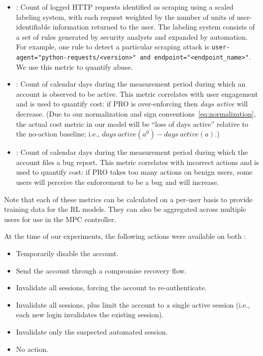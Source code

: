 \begin{itemize}
\squeezelist
    \item \scraping: Count of logged HTTP requests identified as scraping using a scaled labeling system, with each request weighted by the number of units of user-identifiable information returned to the user. The labeling system consists of a set of rules generated by security analysts and expanded by automation. For example, one rule to detect a particular scraping attack is \texttt{user-agent="python-requests/<version>" and endpoint="<endpoint\_name>"}. We use this metric to quantify abuse.
    \item \daysactive: Count of calendar days during the measurement period during which an account is observed to be active. This metric correlates with user engagement and is used to quantify cost: if PRO is over-enforcing then \emph{days active} will decrease. (Due to our normalization and sign conventions~\eqref{eq:normalization}, the actual cost metric in our model will be ``loss of days active'' relative to the no-action baseline; i.e., $days\ active(a^0) - days\ active(a)$.)
    \item \feedback: Count of calendar days during the measurement period during which the account files a bug report. This metric correlates with incorrect actions and is used to quantify cost: if PRO takes too many actions on benign users, some users will perceive the enforcement to be a bug and \feedback will increase.
\end{itemize}

\noindent Note that each of these metrics can be calculated on a per-user basis to provide training data for the RL models. They can also be aggregated across multiple users for use in the MPC controller.

At the time of our experiments, the following actions were available on both \osns:
\begin{itemize}
\squeezelist
    \item Temporarily disable the account. %
    \item Send the account through a compromise recovery flow.
    \item Invalidate all sessions, forcing the account to re-authenticate.
    \item Invalidate all sessions, plus limit the account to a single active session (i.e., each new login invalidates the existing session).
    \item Invalidate only the suspected automated session.
    \item No action.
\end{itemize}

